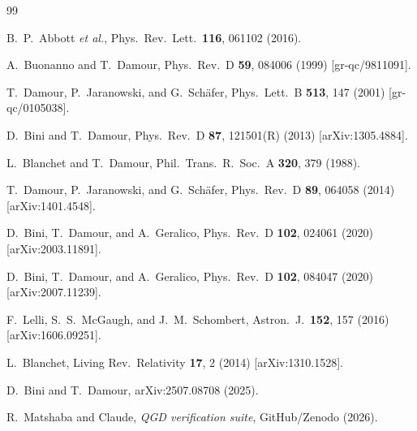 \documentclass[twocolumn,aps,prd,showpacs,superscriptaddress,floatfix]{revtex4-2}
\begin{document}
\begin{thebibliography}{99}

B.~P.\ Abbott \emph{et al.}, Phys.\ Rev.\ Lett.\ \textbf{116}, 061102 (2016).

A.~Buonanno and T.~Damour,
Phys.\ Rev.\ D \textbf{59}, 084006 (1999) [gr-qc/9811091].

T.~Damour, P.~Jaranowski, and G.~Sch\"afer,
Phys.\ Lett.\ B \textbf{513}, 147 (2001) [gr-qc/0105038].

D.~Bini and T.~Damour,
Phys.\ Rev.\ D \textbf{87}, 121501(R) (2013) [arXiv:1305.4884].

L.~Blanchet and T.~Damour,
Phil.\ Trans.\ R.\ Soc.\ A \textbf{320}, 379 (1988).

T.~Damour, P.~Jaranowski, and G.~Sch\"afer,
Phys.\ Rev.\ D \textbf{89}, 064058 (2014) [arXiv:1401.4548].

D.~Bini, T.~Damour, and A.~Geralico,
Phys.\ Rev.\ D \textbf{102}, 024061 (2020) [arXiv:2003.11891].

D.~Bini, T.~Damour, and A.~Geralico,
Phys.\ Rev.\ D \textbf{102}, 084047 (2020) [arXiv:2007.11239].

F.~Lelli, S.~S.~McGaugh, and J.~M.~Schombert,
Astron.\ J.\ \textbf{152}, 157 (2016) [arXiv:1606.09251].

L.~Blanchet,
Living Rev.\ Relativity \textbf{17}, 2 (2014) [arXiv:1310.1528].

D.~Bini and T.~Damour, arXiv:2507.08708 (2025).

R.~Matshaba and Claude,
\textit{QGD verification suite}, GitHub/Zenodo (2026).

\end{thebibliography}
\end{document}
